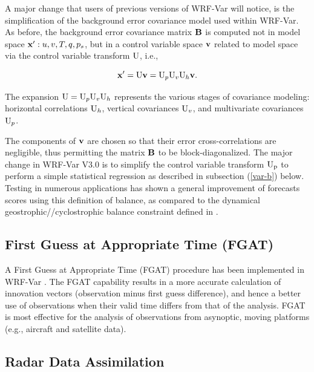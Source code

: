 A major change that users of previous versions of WRF-Var will notice, is the simplification
of the background error covariance model used within WRF-Var. As before, the background error covariance matrix ${\bf B}$ is computed not in model space ${\bf x}': u, v, T, q, p_{s}$, but in a 
control variable space ${\bf v}$ related to model space via the control variable transform ${\rm U}$, 
i.e.,

\begin{equation}
{\bf x}' = {\rm U}{\bf v}= {\rm U}_{p} {\rm U}_{v} {\rm U}_{h}{\bf v}.
\label{var-cv}
\end{equation}

The expansion ${\rm U}={\rm U}_{p} 
{\rm U}_{v} {\rm U}_{h}$ represents the various stages of covariance modeling: horizontal correlations ${\rm U}_{h}$, vertical covariances ${\rm U}_{v}$, and multivariate covariances
${\rm U}_{p}$.

The components of ${\bf v}$ are chosen so that their error cross-correlations are negligible, 
thus permitting the matrix ${\bf B}$ to be block-diagonalized. The major change in WRF-Var V3.0
is to simplify the control variable transform ${\rm U_p}$ to perform a simple statistical regression as described in subsection 
(\ref{var-b}) below. Testing in numerous applications has shown 
a general improvement of forecasts scores using this definition of balance, as compared to the dynamical geostrophic//cyclostrophic balance constraint defined in \citet{barker03}.

\subsection{First Guess at Appropriate Time (FGAT)}

A First Guess at Appropriate Time (FGAT) procedure has been implemented in 
WRF-Var \citep{lee04}.
 The FGAT capability results in a more accurate calculation of innovation vectors 
(observation minus first guess difference), and hence a better use of observations when 
their valid time differs from that of the analysis. 
FGAT is most effective for the analysis of observations from 
asynoptic, moving platforms (e.g., aircraft and satellite data).

\subsection{Radar Data Assimilation}

